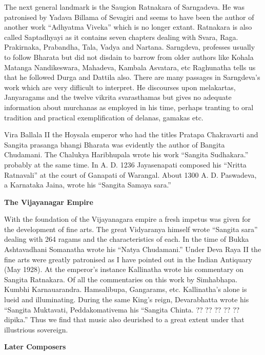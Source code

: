 \documentclass{book}
\begin{document}
The next general landmark is the Saugion Ratnakara of Sarngadeva. He
was patronised by Yadava Billama of Sevagiri and seems to have been
the author of another work ``Adhyatma Viveka'' which is no longer
extant. Ratnakara is also called Saptadhyayi as it contains seven
chapters dealing with Svara, Raga. Prakirnaka, Prabandha, Tala, Vadya
and Nartana. Sarngdeva, professes usually to follow Bharata but did
not disdain to barrow from older authors like Kohala Matanga
Nandikeswara, Mahadeva, Kambala Asvatara, etc Raghunatha tells us that
he followed Durga and Dattila also. There are many passages in
Sarngdeva's work which are very diflicult to interpret. He discourses
upon melakartas, Janyaragams and the twelve vikrita svarasthamas but
gives no adequate information about murchanas as employed in his time,
perhaps tranting to oral tradition and practical exemplification of
delanas, gamakas etc. 

Vira Ballala II the Hoysala emperor who had the titles Pratapa
Chakravarti and Sangita prasanga bhangi Bharata was evidently the
author of Bangita Chudamani. The Chalukya Haribhupala wrote his work
``Sangita Sudhakara.'' probably at the same time. In A. D. 1236
Jayasenapati composed his ``Nritta Ratnavali'' at the court of
Ganapati of Warangal. About 1300 A. D. Paswadeva, a Karnataka Jaina,
wrote his ``Sangita Samaya sara.''

\begin{center} 
\textbf{The Vijayanagar Empire}
\end{center}

With the foundation of the Vijayanagara empire a fresh impetus was
given for the development of fine arts. The great Vidyaranya himself
wrote ``Sangita sara'' dealing with 264 ragams and the characteristics
of each. In the time of Bukka Ashtavadhani Somanatha wrote his ``Natya
Chudamani.'' Under Deva Raya II the fine arts were greatly patronised
as I have pointed out in the Indian Antiquary (May 1928). At the
emperor's instance Kallinatha wrote his commentary on Sangita
Ratnakara. Of all the commentaries on this work by Simhabhapa. Kumbhi
Karnauarandra. Hamsalibupa, Gangarams, etc. Kallinatha's alone is
lueid and illuminating.  During the same King's reign, Devarabhatta
wrote his ``Sangita Muktavati, Peddakomativema his ``Sangita
Chinta. ?? ?? ?? ?? ?? dipika.'' Thus we find that music also
deurished to a great extent under that illustrious sovereign.

\begin{center}
\textbf{Later Composers}
\end{center}
\end{document}
